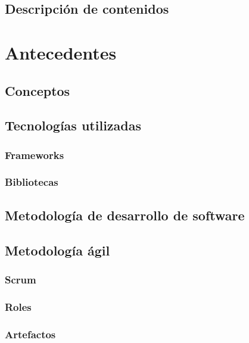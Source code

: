 \documentclass{iccmemoria}
\begin{document}
	\section{Descripción de contenidos}
	

\chapter{Antecedentes}

	\section{Conceptos}
		

	\section{Tecnologías utilizadas}
		
		\subsection{Frameworks}
		
		\subsection{Bibliotecas}
		

	\section{Metodología de desarrollo de software}
		

	\section{Metodología ágil}
	
		\subsection{Scrum}
		
		\subsection{Roles}
		
		\subsection{Artefactos}
		
\end{document}
